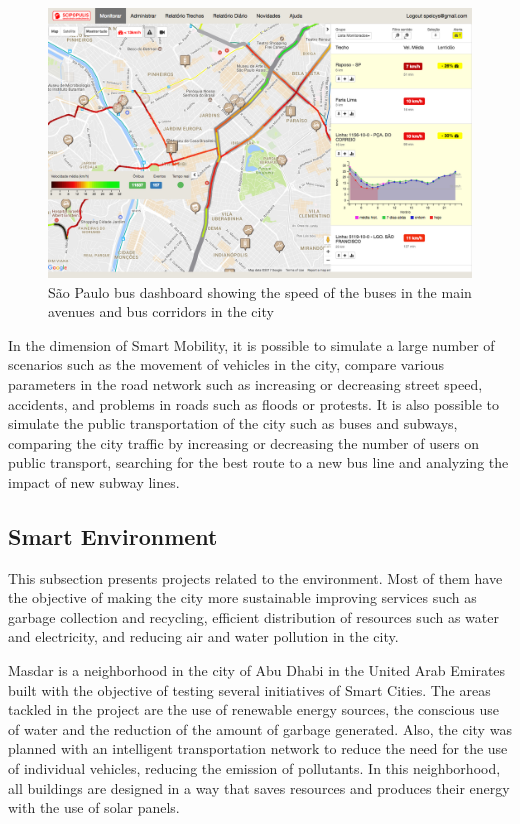 \begin{figure}[!htb]
\centering
\includegraphics[scale=0.30]{figuras/scipopulis}
\caption{S\~ao Paulo bus dashboard showing the speed of the buses in the main avenues and bus corridors in the city}
\label{figure:scipopulis}
\end{figure}

In the dimension of Smart Mobility, it is possible to simulate a large number of scenarios such as the movement of vehicles in the city, compare various parameters in the road network such as increasing or decreasing street speed, accidents, and problems in roads such as floods or protests. It is also possible to simulate the public transportation of the city such as buses and subways, comparing the city traffic by increasing or decreasing the number of users on public transport, searching for the best route to a new bus line and analyzing the impact of new subway lines.

\subsection{Smart Environment}

This subsection presents projects related to the environment. Most of them have the objective of making the city more sustainable improving services such as garbage collection and recycling, efficient distribution of resources such as water and electricity, and reducing air and water pollution in the city.

Masdar is a neighborhood in the city of Abu Dhabi in the United Arab Emirates built with the objective of testing several initiatives of Smart Cities. The areas tackled in the project are the use of renewable energy sources, the conscious use of water and the reduction of the amount of garbage generated. Also, the city was planned with an intelligent transportation network to reduce the need for the use of individual vehicles, reducing the emission of pollutants. In this neighborhood, all buildings are designed in a way that saves resources and produces their energy with the use of solar panels.

